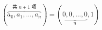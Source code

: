 \[ ( \overbrace{a_0,a_1,\dots,a_n}
  ^{\text{共 $n+1$ 项}} ) =
( \underbrace{0,0,\dots,0}_{n} , 1 ) \]

